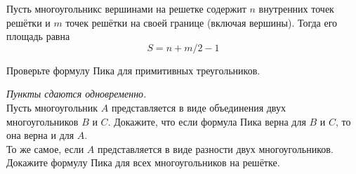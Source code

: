 Пусть многоугольникс вершинами на решетке содержит $n$ внутренних точек решётки
и $m$ точек решётки на своей границе (включая вершины).
Тогда его площадь равна
\[
    S = n + m/2 - 1
\]

\begin{problems}

\itemx{$^\circ$}
Проверьте формулу Пика для примитивных треугольников.

\item
\emph{Пункты сдаются одновременно.}
\\
\sp
Пусть многоугольник $A$ представляется в виде объединения двух многоугольников
$B$ и $C$.
Докажите, что если формула Пика верна для $B$ и $C$, то она верна и для $A$.
\\
\sp
То же самое, если $A$ представляется в виде разности двух многоугольников.
\\
\sp
Докажите формулу Пика для всех многоугольников на решётке.

\end{problems}

